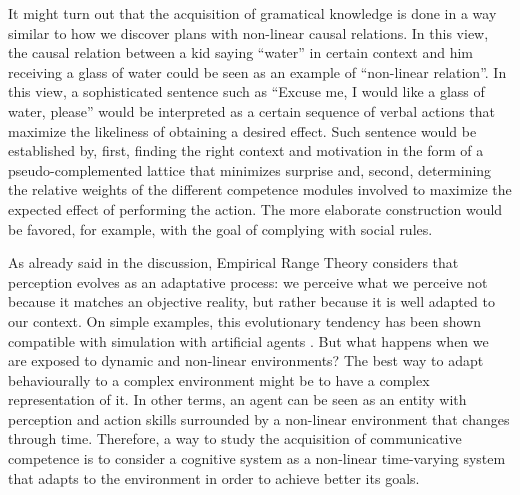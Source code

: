 \documentclass[
		twoside,openright,titlepage,numbers=noenddot,manychapters,
		headinclude,%
                footinclude=false,cleardoublepage=empty,
                BCOR=5mm,
		fontsize=11pt, %
                 enabledeprecatedfontcommands]{scrreprt}
\begin{document}


It might turn out that the acquisition of gramatical knowledge is done in a way similar  to how we discover plans with non-linear causal relations. In this view, the causal relation between 
 a kid saying ``water'' in certain context and him receiving a glass of water could be seen as an  example of ``non-linear relation''. In this view,  a sophisticated sentence such as ``Excuse me, I would like a glass of water, please'' would be interpreted as a certain sequence of verbal actions that maximize the likeliness of obtaining a desired effect. Such sentence would be established by, first, finding the right context and motivation in the form of a pseudo-complemented lattice that minimizes surprise and, second, determining the relative weights of the different competence modules involved to maximize the expected effect of performing the action. The more elaborate construction would be favored, for example, with the goal of complying with social rules.


As already said in the discussion, Empirical Range Theory considers that perception evolves as an adaptative process: we perceive what we perceive not because it matches an objective reality, but rather because it is well adapted to our context. On simple examples, this evolutionary tendency  has been shown compatible with simulation with artificial agents \cite[]{purves2006evolution}.  But what happens when we are exposed to dynamic and non-linear environments? The best way to adapt behaviourally to a complex environment might be to have a complex representation of it.  In other terms, an agent can be seen as an entity with perception and action skills surrounded by a non-linear environment that changes through time. Therefore, a way to study the acquisition of communicative competence is to consider a cognitive system as a non-linear time-varying system that adapts to the environment in order to achieve better its goals.
\end{document}

